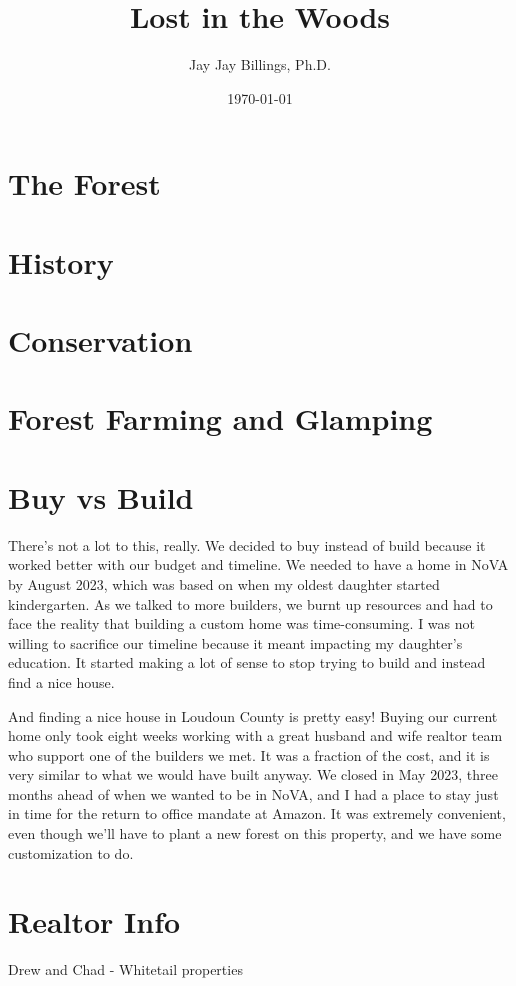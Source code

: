 \documentclass{article}
\title{Lost in the Woods}
\author{Jay Jay Billings, Ph.D.}
\date{\today}
\begin{document}
\maketitle



\section*{The Forest}

\section*{History}

\section*{Conservation}

\section*{Forest Farming and Glamping}

\section*{Buy vs Build}

There's not a lot to this, really. We decided to buy instead of build because it worked better with our budget and timeline. We needed to have a home in NoVA by August 2023, which was based on when my oldest daughter started kindergarten. As we talked to more builders, we burnt up resources and had to face the reality that building a custom home was time-consuming. I was not willing to sacrifice our timeline because it meant impacting my daughter's education. It started making a lot of sense to stop trying to build and instead find a nice house. 

And finding a nice house in Loudoun County is pretty easy! Buying our current home only took eight weeks working with a great husband and wife realtor team who support one of the builders we met. It was a fraction of the cost, and it is very similar to what we would have built anyway. We closed in May 2023, three months ahead of when we wanted to be in NoVA, and I had a place to stay just in time for the return to office mandate at Amazon. It was extremely convenient, even though we'll have to plant a new forest on this property, and we have some customization to do. 

\section*{Realtor Info}

Drew and Chad - Whitetail properties
\end{document}
